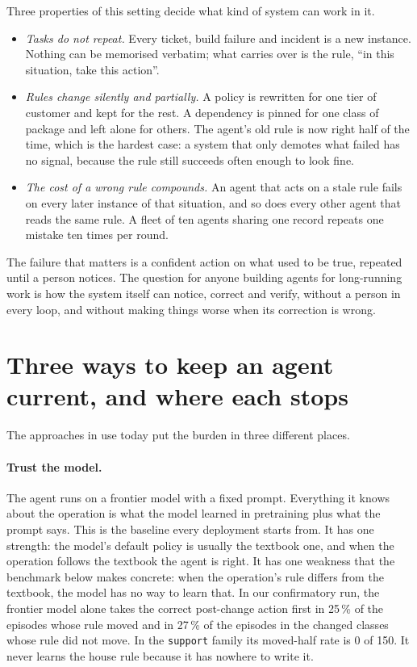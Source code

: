 \documentclass[11pt]{article}
\newcommand{\code}[1]{\texttt{#1}}
\begin{document}
Three properties of this setting decide what kind of system can work in it.

\begin{itemize}[leftmargin=1.4em, itemsep=2pt]
\item \emph{Tasks do not repeat.} Every ticket, build failure and incident is a new instance.
Nothing can be memorised verbatim; what carries over is the rule, ``in this situation, take
this action''.
\item \emph{Rules change silently and partially.} A policy is rewritten for one tier of
customer and kept for the rest. A dependency is pinned for one class of package and left alone
for others. The agent's old rule is now right half of the time, which is the hardest case: a
system that only demotes what failed has no signal, because the rule still succeeds often enough
to look fine.
\item \emph{The cost of a wrong rule compounds.} An agent that acts on a stale rule fails on
every later instance of that situation, and so does every other agent that reads the same
rule. A fleet of ten agents sharing one record repeats one mistake ten times per round.
\end{itemize}

The failure that matters is a confident action on what used to be true, repeated until a
person notices. The question for anyone building agents for
long-running work is how the system itself can notice, correct and verify, without a person in
every loop, and without making things worse when its correction is wrong.

\section{Three ways to keep an agent current, and where each stops}
\label{sec:alternatives}

The approaches in use today put the burden in three different places.

\paragraph{Trust the model.} The agent runs on a frontier model with a fixed prompt. Everything
it knows about the operation is what the model learned in pretraining plus what the prompt
says. This is the baseline every deployment starts from. It has one strength: the model's
default policy is usually the textbook one, and when the operation follows the textbook the agent
is right. It has one weakness that the benchmark below makes concrete: when the operation's rule
differs from the textbook, the model has no way to learn that. In our confirmatory run, the
frontier model alone takes the correct post-change action first in 25\,\% of the episodes whose
rule moved and in 27\,\% of the episodes in the changed classes whose rule did not move.
In the \code{support} family its moved-half rate is 0 of 150. It never learns the house rule
because it has nowhere to write it.
\end{document}
